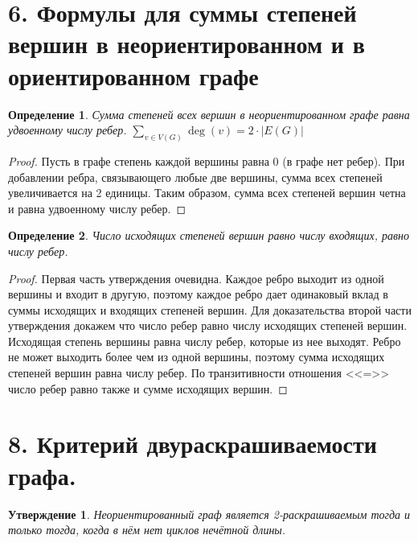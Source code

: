 \documentclass[a4paper,12pt]{article}
\newtheorem*{defin}{Определение}
\newtheorem*{Statements}{Утверждение}
\begin{document}
    \section*{6. Формулы для суммы степеней вершин в неориентированном и в ориентированном графе}

    \begin{defin}
        Сумма степеней всех вершин в неориентированном графе равна удвоенному числу ребер. $\displaystyle\sum_{v \in V(G)} \deg(v) = 2 \cdot |E(G)|$
    \end{defin}
    \begin{proof}
        Пусть в графе степень каждой вершины равна $0$ (в графе нет ребер). При добавлении ребра, связывающего любые две вершины, сумма всех степеней увеличивается на 2 единицы. Таким образом, сумма всех степеней вершин четна и равна удвоенному числу ребер.
    \end{proof}
    \begin{defin}
        Число исходящих степеней вершин равно числу входящих, равно числу ребер.
    \end{defin}
    \begin{proof}
        Первая часть утверждения очевидна. Каждое ребро выходит из одной вершины и входит в другую, поэтому каждое ребро дает одинаковый вклад в суммы исходящих и входящих степеней вершин. Для доказательства второй части утверждения докажем что число ребер равно числу исходящих степеней вершин. Исходящая степень вершины равна числу ребер, которые из нее выходят. Ребро не может выходить более чем из одной вершины, поэтому сумма исходящих степеней вершин равна числу ребер. По транзитивности отношения <<=>> число ребер равно также и сумме исходящих вершин.
    \end{proof}

    \section*{8. Критерий двураскрашиваемости графа.}
    \begin{Statements}
        Неориентированный граф является 2-раскрашиваемым тогда и только тогда,
        когда в нём нет циклов нечётной длины.
    \end{Statements}
\end{document}
